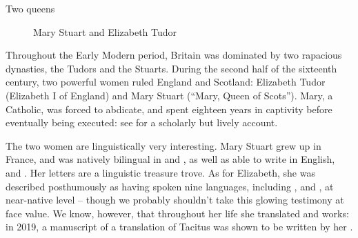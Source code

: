 \begin{peoplebox}{Two queens}
\begin{figure}[H]
    \caption{Mary Stuart and Elizabeth Tudor}
\end{figure}

Throughout the Early Modern period, Britain was dominated by two rapacious dynasties, the Tudors and the Stuarts. During the second half of the sixteenth century, two powerful women ruled England and Scotland: Elizabeth Tudor (Elizabeth I of England) and Mary Stuart (``Mary, Queen of Scots''). Mary, a Catholic, was forced to abdicate, and spent eighteen years in captivity before eventually being executed: see \citet{Guy2004} for a scholarly but lively account.

%

The two women are linguistically very interesting. Mary Stuart grew up in France, and was natively bilingual in  and , as well as able to write in English,  and . Her letters are a linguistic treasure trove. As for Elizabeth, she was described posthumously as having spoken nine languages, including ,  and , at near-native level -- though we probably shouldn't take this glowing testimony at face value. We know, however, that throughout her life she translated  and  works: in 2019, a manuscript of a translation of Tacitus was shown to be written by her \citep{Philo2020}.

\end{peoplebox}



